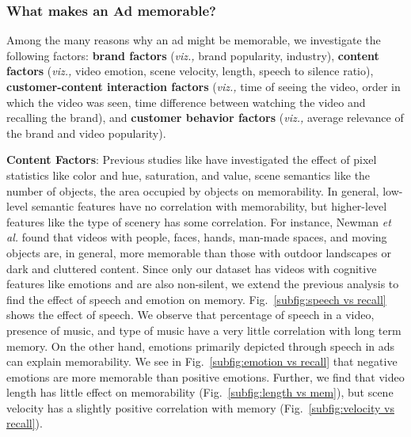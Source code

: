\subsubsection{What makes an Ad memorable?}
\label{sec:What makes an Ad memorable?}
Among the many reasons why an ad might be memorable, we investigate the following factors: \textbf{brand factors} (\textit{viz.,} brand popularity, industry), \textbf{content factors} (\textit{viz.,} video emotion, scene velocity, length, speech to silence ratio), \textbf{customer-content interaction factors} (\textit{viz.,} time of seeing the video, order in which the video was seen, time difference between watching the video and recalling the brand), and \textbf{customer behavior factors} (\textit{viz.,} average relevance of the brand and video popularity).


\textbf{Content Factors}: %
Previous studies like \cite{isola2011makes,newman2020multimodal} have investigated the effect of pixel statistics like color and hue, saturation, and value, scene semantics like the number of objects, the area occupied by objects on memorability. In general, low-level semantic features have no correlation with memorability, but higher-level features like the type of scenery has some correlation. For instance, Newman \textit{et al.} \cite{newman2020multimodal} found that videos with
people, faces, hands, man-made spaces, and moving objects are, in general, more memorable than those with outdoor landscapes or dark and cluttered content. Since only our dataset has videos with cognitive features like emotions and are also non-silent, we extend the previous analysis to find the effect of speech and emotion on memory. Fig.~\ref{subfig:speech vs recall} shows the effect of speech. We observe that percentage of speech in a video, presence of music, and type of music have a very little correlation with long term memory. On the other hand, emotions primarily depicted through speech in ads can explain memorability. We see in Fig.~\ref{subfig:emotion vs recall} that negative emotions are more memorable than positive emotions. Further, %
we find that video length has little effect on memorability (Fig.~\ref{subfig:length vs mem}), but scene velocity has a slightly positive correlation with memory (Fig.~\ref{subfig:velocity vs recall}).



